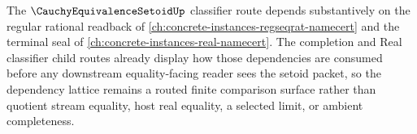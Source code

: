The $\CauchyEquivalenceSetoidUp$ classifier route depends substantively on the regular rational readback of \autoref{ch:concrete-instances-regseqrat-namecert} and the terminal seal of \autoref{ch:concrete-instances-real-namecert}. The completion and Real classifier child routes already display how those dependencies are consumed before any downstream equality-facing reader sees the setoid packet, so the dependency lattice remains a routed finite comparison surface rather than quotient stream equality, host real equality, a selected limit, or ambient completeness.
